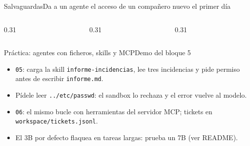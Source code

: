 \begin{frame}{Salvaguardas}{Da a un agente el acceso de un compañero nuevo el primer día}
	\begin{columns}[T]
		\begin{column}{0.31\textwidth}
		\end{column}
		\begin{column}{0.31\textwidth}
		\end{column}
		\begin{column}{0.31\textwidth}
		\end{column}
	\end{columns}
\end{frame}

\begin{frame}{Práctica: agentes con ficheros, skills y MCP}{Demo del bloque 5}
	\begin{itemize}
		\footnotesize
		\item \texttt{05}: carga la skill \texttt{informe-incidencias}, lee tres incidencias y pide permiso antes de escribir \texttt{informe.md}.
		\item Pídele leer \texttt{../etc/passwd}: el sandbox lo rechaza y el error vuelve al modelo.
		\item \texttt{06}: el mismo bucle con herramientas del servidor MCP; tickets en \texttt{workspace/tickets.jsonl}.
		\item El 3B por defecto flaquea en tareas largas: prueba un 7B (ver README).
	\end{itemize}
\end{frame}

